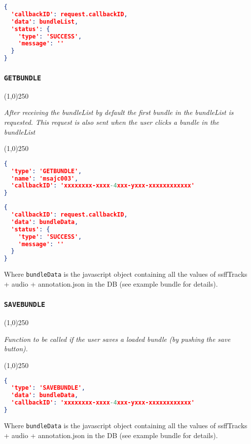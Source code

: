\documentclass[A4,12pt, utf8]{article}
\begin{document}
\begin{lstlisting}[caption=Reply content, language=json]
{
  'callbackID': request.callbackID,
  'data': bundleList,
  'status': {
    'type': 'SUCCESS',
    'message': ''
  }
}
\end{lstlisting}

\subsubsection{\texttt{GETBUNDLE}}
\begin{center}
  \line(1,0){250}

  \textit{After receiving the bundleList by default the first bundle in the bundleList is requested. This request is also sent when the user clicks a bundle in the bundleList}

  \line(1,0){250}
\end{center}


\begin{lstlisting}[caption=Request content, language=json]
{
  'type': 'GETBUNDLE',
  'name': 'msajc003',
  'callbackID': 'xxxxxxxx-xxxx-4xxx-yxxx-xxxxxxxxxxxx'
}
\end{lstlisting}

\begin{lstlisting}[caption=Reply content, language=json]
{
  'callbackID': request.callbackID,
  'data': bundleData,
  'status': {
    'type': 'SUCCESS',
    'message': ''
  }
}
\end{lstlisting}
Where \texttt{bundleData} is the javascript object containing all the values of ssffTracks + audio + annotation.json in the DB (see example bundle for details).

\subsubsection{\texttt{SAVEBUNDLE}}
\begin{center}
  \line(1,0){250}

  \textit{Function to be called if the user saves a loaded bundle (by pushing the save button).}

  \line(1,0){250}
\end{center}


\begin{lstlisting}[caption=Request content, language=json]
{
  'type': 'SAVEBUNDLE',
  'data': bundleData,
  'callbackID': 'xxxxxxxx-xxxx-4xxx-yxxx-xxxxxxxxxxxx'
}
\end{lstlisting}
Where \texttt{bundleData} is the javascript object containing all the values of ssffTracks + audio + annotation.json in the DB (see example bundle for details).
\end{document}

